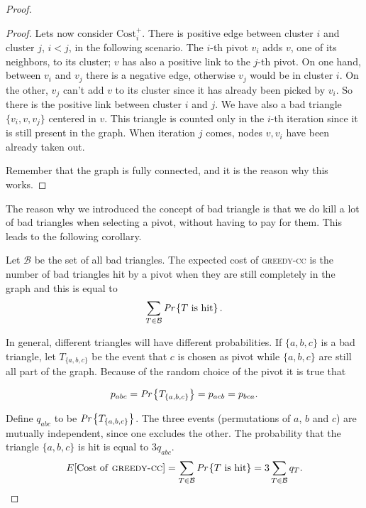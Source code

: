 \begin{proof}
\begin{proof}
		Lets now consider $\text{Cost}_i^+$. There is positive edge between cluster $i$ and cluster $j$, $i < j$, in the following scenario. The $i$-th pivot $v_i$ adds $v$, one of its neighbors, to its cluster; $v$ has also a positive link to the $j$-th pivot. On one hand, between $v_i$ and $v_j$ there is a negative edge, otherwise $v_j$ would be in cluster $i$. On the other, $v_j$ can't add $v$ to its cluster since it has already been picked by $v_i$. So there is the positive link between cluster $i$ and $j$. We have also a bad triangle $\{v_i, v, v_j\}$ centered in $v$. This triangle is counted only in the $i$-th iteration since it is still present in the graph. When iteration $j$ comes, nodes $v, v_i$ have been already taken out. 
		
		Remember that the graph is fully connected, and it is the reason why this works.
	\end{proof}
	
	The reason why we introduced the concept of bad triangle is that we do kill a lot of bad triangles  when selecting a pivot, without having to pay for them. This leads to the following corollary.
	\begin{cor}
		Let $\mathcal{B}$ be the set of all bad triangles. The expected cost of \textsc{greedy-cc} is the number of bad triangles hit by a pivot when they are still completely in the graph and this is equal to
		\begin{equation}
		\sum_{T \in \mathcal{B}}\emph{Pr}\left\{T \text{ is hit}\right\}.
		\end{equation}
	\end{cor}
	In general, different triangles will have different probabilities. If $\{a, b, c\}$ is a bad triangle, let $T_{\{a,b,c\}}$ be the event that $c$ is chosen as pivot while $\{a, b, c\}$ are still all part of the graph. Because of the random choice of the pivot it is true that
	
	\begin{equation}
	p_{abc} = \emph{Pr}\left\{T_{\{a,b,c\}}\right\} = p_{acb} = p_{bca}.
	\end{equation}
	
	Define $q_{abc}$ to be $\emph{Pr}\left\{T_{\{a,b,c\}}\right\}$. The three events (permutations of $a$, $b$ and $c$) are mutually independent, since one excludes the other. The probability that the triangle $\{a,b,c\}$ is hit is equal to $3q_{abc}$.
	\begin{equation}\label{cc_3approx_eq}
		E[\text{Cost of \textsc{greedy-cc}}] = 	\sum_{T \in \mathcal{B}}\emph{Pr}\left\{T \text{ is hit}\right\} = 3\sum_{T \in \mathcal{B}} q_T.
	\end{equation}
	

\end{proof}
